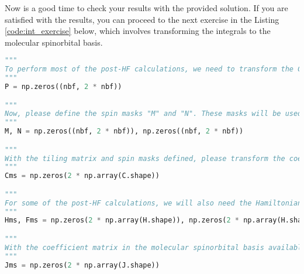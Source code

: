 Now is a good time to check your results with the provided solution. If you are satisfied with the results, you can proceed to the next exercise in the Listing \ref{code:int_exercise} below, which involves transforming the integrals to the molecular spinorbital basis.

\raggedbottom\begin{lstlisting}[language=Python, caption={Integral transform exercise code.}, label=code:int_exercise]
"""
To perform most of the post-HF calculations, we need to transform the Coulomb integrals to the molecular spinorbital basis, so if you don't plan to calculate any post-HF methods, you can end the eercise here. The restricted MP2 calculation could be done using the Coulomb integral in MO basis, but for the sake of subsequent calculations, we enforce here the integrals in the MS basis. The first thing you will need for the transform is the coefficient matrix in the molecular spinorbital basis. To perform this transform using the mathematical formulation presented in the materials, the first step is to form the tiling matrix "P" which will be used to duplicate columns of a general matrix. Please define it here.
"""
P = np.zeros((nbf, 2 * nbf))

"""
Now, please define the spin masks "M" and "N". These masks will be used to zero out spinorbitals, that should be empty.
"""
M, N = np.zeros((nbf, 2 * nbf)), np.zeros((nbf, 2 * nbf))

"""
With the tiling matrix and spin masks defined, please transform the coefficient matrix into the molecular spinorbital basis. The resulting matrix should be stored in the "Cms" variable.
"""
Cms = np.zeros(2 * np.array(C.shape))

"""
For some of the post-HF calculations, we will also need the Hamiltonian and Fock matrix in the molecular spinorbital basis. Please transform it and store it in the "Hms" and "Fms" variable. If you don't plan to calculate the CCSD method, you can skip the transformation of the Fock matrix, as it is not needed for the MP2 and CI calculations.
"""
Hms, Fms = np.zeros(2 * np.array(H.shape)), np.zeros(2 * np.array(H.shape))

"""
With the coefficient matrix in the molecular spinorbital basis available, we can proceed to transform the Coulomb integrals. It is important to note that the transformed integrals will contain twice as many elements along each axis compared to their counterparts in the atomic orbital (AO) basis. This increase is due to the representation of both spin states in the molecular spinorbital basis.
"""
Jms = np.zeros(2 * np.array(J.shape))


\end{lstlisting}
